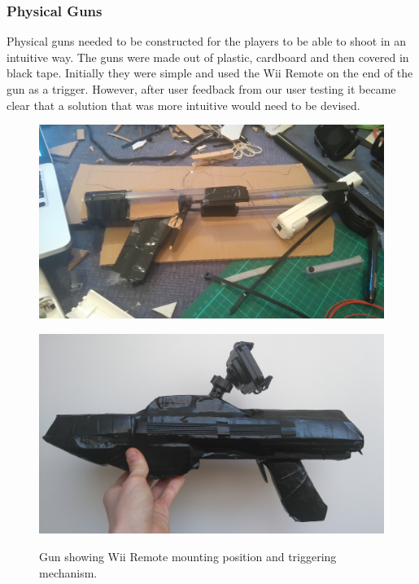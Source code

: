 \documentclass[a4paper,11pt]{article}
\begin{document}
\subsubsection{Physical Guns}
Physical guns needed to be constructed for the players to be able to shoot in an intuitive way. The guns were made out of plastic, cardboard and then covered in black tape. Initially they were simple and used the Wii Remote on the end of the gun as a trigger. However, after user feedback from our user testing it  became clear that a solution that was more intuitive would need to be devised.


\begin{figure}[ht]
  \centering
  \captionsetup{width=.45\textwidth}
  
  \begin{minipage}{.5\textwidth}
      \centering
      \includegraphics[width=.9\textwidth]{gun}
      \caption{Gun showing Wii Remote mounting position and triggering mechanism.}
      \label{fig:gun1}
  \end{minipage}%
  \begin{minipage}{.5\textwidth}
    \centering
    \includegraphics[width=.9\textwidth]{gun2}
    \label{fig:gun2}
  \end{minipage}
\end{figure}
\end{document}
